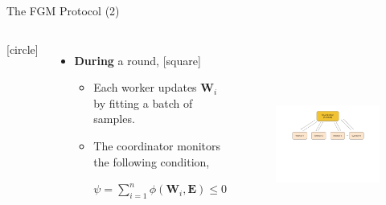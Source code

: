 \begin{frame}{The FGM Protocol (2)}
    \begin{columns}
        \vspace{-1cm}
        [circle]
        \begin{itemize}
            \item{\textbf{During} a round,
            \vspace{0.2cm}
            [square]
            \begin{itemize}
                \item{Each worker updates $\pmb{W}_i$ by fitting a batch of samples.}
                \vspace{0.3cm}
                \item{The coordinator monitors the following condition,\\
                \begin{center}
                    $\psi = \sum_{i=1}^n\phi(\pmb{W}_i,\pmb{E}) \leq 0$
                \end{center}
                }
            \end{itemize}
            }
        \end{itemize}
        \begin{figure}
            \includegraphics[width=8.5cm,height=6cm,center]{images/ml-fgm-2.png}\label{fig:ml-fgm-2}
        \end{figure}
    \end{columns}
\end{frame}

